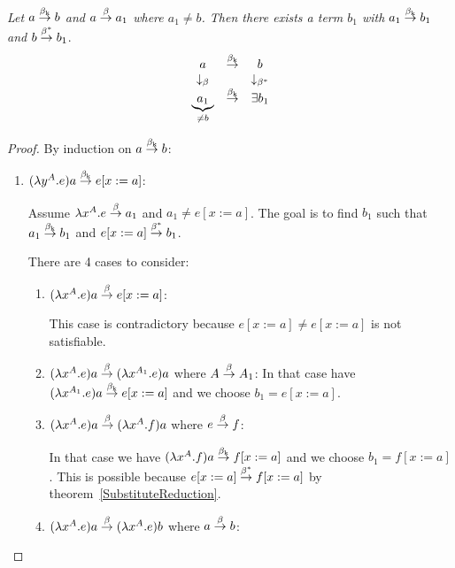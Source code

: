 \begin{lemma}
    \label{KeyReductionDiamond}
    \emph{Let $a \stackrel{\beta_{\text{k}}}{\to} b$ and $a \stackrel{\beta}{\to} a_1$ where $a_1 \ne b$. Then there
    exists a term $b_1$ with $a_1 \stackrel{\beta_{\text{k}}}{\to} b_1$ and $b \stackrel{\beta^*}{\to} b_1$}.
    $$
    \begin{array}{ccc}
        a
        & \stackrel{\beta_{\text{k}}}{\to}
        & b
        \\
        \downarrow_\beta
        &
        & \downarrow_{\beta^*}
        \\
        \underbrace{a_1}_{\ne b}
        & \stackrel{\beta_{\text{k}}}{\to}
        & \exists b_1
    \end{array}
    $$
    \begin{proof}
        By induction on $a \stackrel{\beta_{\text{k}}}{\to} b$:
        \begin{enumerate}
            \item $(\lambda y^A.e) a \stackrel{\beta_{\text{k}}}{\to} e[x:=a]$:

                Assume $\lambda x^A.e
                \stackrel{\beta}{\to} a_1$ and $a_1 \ne e[x:=a]$. The goal is to find $b_1$
                such that $a_1 \stackrel{\beta_{\text{k}}}{\to} b_1$ and $e[x:=a] \stackrel{\beta^*}{\to} b_1$.

                There are 4 cases to consider:
                \begin{enumerate}
                    \item $(\lambda x^A.e)a \stackrel{\beta}{\to} e[x:=a]$:

                        This case is
                        contradictory because $e[x:=a] \ne e[x:=a]$ is not
                        satisfiable.

                    \item $(\lambda x^A.e)a \stackrel{\beta}{\to} (\lambda x^{A_1}.e) a$ where
                        $A \stackrel{\beta}{\to} A_1$: In that case have $(\lambda x^{A_1}.e)
                        a \stackrel{\beta_{\text{k}}}{\to} e[x:=a]$ and we choose $b_1 = e[x:=a]$.

                    \item $(\lambda x^A.e)a \stackrel{\beta}{\to} (\lambda x^A.f) a$ where $e
                        \stackrel{\beta}{\to} f$:

                        In that case we have $(\lambda x^A.f)a
                        \stackrel{\beta_{\text{k}}}{\to} f[x:=a]$ and we choose $b_1 = f[x:=a]$. This
                        is possible because $e[x:=a] \stackrel{\beta^*}{\to} f[x:=a]$ by
                        theorem~\ref{SubstituteReduction}.

                    \item $(\lambda x^A.e)a \stackrel{\beta}{\to} (\lambda x^A.e)b$ where $a
                        \stackrel{\beta}{\to} b$:


\end{enumerate}
\end{enumerate}
\end{proof}
\end{lemma}
